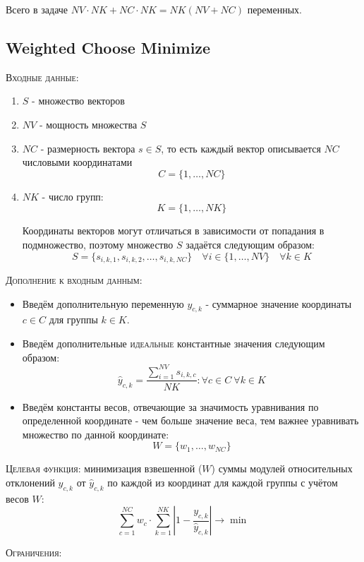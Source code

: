 \documentclass[%
10pt, %
final, %
oneside, %
onecolumn, %
centertags]{article} %
\theoremstyle{plain}
\theoremstyle{definition}
\theoremstyle{remark}
\begin{document}
Всего в задаче $NV\cdot NK + NC\cdot NK = NK(NV+NC)$ переменных.


\newpage
\subsection{Weighted Choose Minimize}

\textsc{Входные данные}: 
\begin{enumerate}
	\item $S$ - множество векторов
	\item $NV$ - мощность множества $S$
	\item $NC$ - размерность вектора $s \in S$, то есть каждый вектор описывается $NC$ числовыми координатами
	$$C = \{1,\ldots,NC\}$$
	\item $NK$ - число групп:
	$$K = \{1,\ldots,NK\}$$

	Координаты векторов могут отличаться в зависимости от попадания в подмножество, поэтому множество $S$ задаётся следующим образом:
	$$S = \{s_{i,k,1},s_{i,k,2},\ldots,s_{i,k,NC}\} \quad \forall i \in \{1,\ldots,NV\} \quad \forall k \in K$$
	
\end{enumerate}
\textsc{Дополнение к входным данным}:
\begin{itemize}
	\item Введём дополнительную переменную $y_{c,k}$ - суммарное значение координаты $c \in C$ для группы $k \in K$.
	\item Введём дополнительные \textsc{идеальные} константные значения следующим образом:
	$$\hat{y}_{c,k} = \frac{\sum\limits_{i=1}^{NV}s_{i,k,c}}{NK} : \forall c \in C \ \forall k \in K$$
	\item Введём константы весов, отвечающие за значимость уравнивания по определенной координате - чем больше значение веса, тем важнее уравнивать множество по данной координате:
	$$W = \{w_1,\ldots,w_{NC}\}$$
\end{itemize}

\textsc{Целевая функция:} минимизация взвешенной ($W$) суммы модулей относительных отклонений $y_{c,k}$ от $\hat{y}_{c,k}$ по каждой из координат для каждой группы с учётом весов $W$:
$$\sum\limits_{c=1}^{NC} w_c \cdot \sum\limits_{k=1}^{NK}  \left\vert 1 - \frac{y_{c,k}}{\hat{y}_{c,k}}\right\vert \to \min$$

\newpage
\textsc{Ограничения}:
\end{document}
